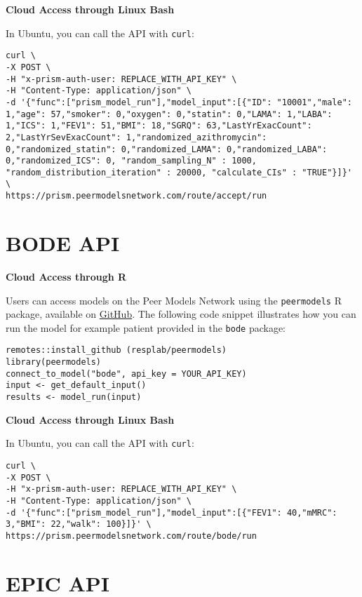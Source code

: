 \documentclass[
]{book}
\begin{document}
\textbf{Cloud Access through Linux Bash}

In Ubuntu, you can call the API with \texttt{curl}:

\begin{verbatim}
curl \
-X POST \
-H "x-prism-auth-user: REPLACE_WITH_API_KEY" \
-H "Content-Type: application/json" \
-d '{"func":["prism_model_run"],"model_input":[{"ID": "10001","male": 1,"age": 57,"smoker": 0,"oxygen": 0,"statin": 0,"LAMA": 1,"LABA": 1,"ICS": 1,"FEV1": 51,"BMI": 18,"SGRQ": 63,"LastYrExacCount": 2,"LastYrSevExacCount": 1,"randomized_azithromycin": 0,"randomized_statin": 0,"randomized_LAMA": 0,"randomized_LABA": 0,"randomized_ICS": 0, "random_sampling_N" : 1000, "random_distribution_iteration" : 20000, "calculate_CIs" : "TRUE"}]}' \
https://prism.peermodelsnetwork.com/route/accept/run
\end{verbatim}

\hypertarget{bode-api}{%
\section{BODE API}\label{bode-api}}

\textbf{Cloud Access through R}

Users can access models on the Peer Models Network using the \texttt{peermodels} R package, available on \href{https://github.com/resplab/peermodels}{GitHub}. The following code snippet illustrates how you can run the model for example patient provided in the \texttt{bode} package:

\begin{verbatim}
remotes::install_github (resplab/peermodels)
library(peermodels)
connect_to_model("bode", api_key = YOUR_API_KEY)
input <- get_default_input()
results <- model_run(input)
\end{verbatim}

\textbf{Cloud Access through Linux Bash}

In Ubuntu, you can call the API with \texttt{curl}:

\begin{verbatim}
curl \
-X POST \
-H "x-prism-auth-user: REPLACE_WITH_API_KEY" \
-H "Content-Type: application/json" \
-d '{"func":["prism_model_run"],"model_input":[{"FEV1": 40,"mMRC": 3,"BMI": 22,"walk": 100}]}' \
https://prism.peermodelsnetwork.com/route/bode/run
\end{verbatim}

\hypertarget{epic-api}{%
\section{EPIC API}\label{epic-api}}
\end{document}

